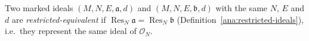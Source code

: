 \begin{definition}
\label{hir:restricted-equivalence}
\leanok
Two marked ideals \((M,N,E,\mathfrak a,d)\) and \((M,N,E,\mathfrak b,d)\) with the same \(N\), \(E\) and \(d\) are \emph{restricted-equivalent} if
\(\operatorname{Res}_N\mathfrak a=\operatorname{Res}_N\mathfrak b\) (Definition~\ref{ana:restricted-ideals}), i.e.\ they represent the same ideal of \(\mathcal O_N\).
\end{definition}

